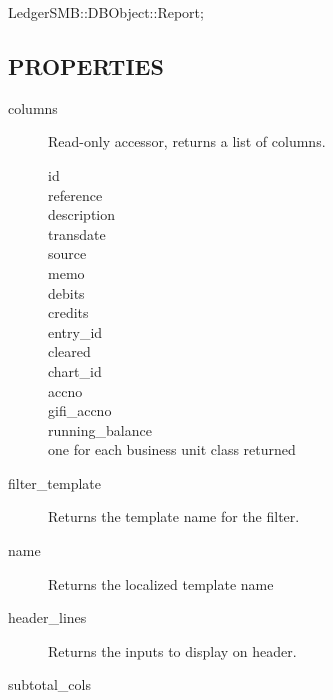 \begin{description}
\begin{description}
\begin{description}
\begin{description}
\begin{description}
\begin{description}
\begin{description}
\begin{description}
\begin{description}
\begin{description}
\begin{description}
\item[{LedgerSMB::DBObject::Report;}] \mbox{}\end{description}
\subsection*{PROPERTIES\label{LedgerSMB::DBObject::Report::GL_PROPERTIES}}
\begin{description}

\item[{columns}] \mbox{}

Read-only accessor, returns a list of columns.

\begin{description}

\item[{id}] \mbox{}
\item[{reference}] \mbox{}
\item[{description}] \mbox{}
\item[{transdate}] \mbox{}
\item[{source}] \mbox{}
\item[{memo}] \mbox{}
\item[{debits}] \mbox{}
\item[{credits}] \mbox{}
\item[{entry\_id}] \mbox{}
\item[{cleared}] \mbox{}
\item[{chart\_id}] \mbox{}
\item[{accno}] \mbox{}
\item[{gifi\_accno}] \mbox{}
\item[{running\_balance}] \mbox{}
\item[{one for each business unit class returned}] \mbox{}\end{description}

\item[{filter\_template}] \mbox{}

Returns the template name for the filter.


\item[{name}] \mbox{}

Returns the localized template name


\item[{header\_lines}] \mbox{}

Returns the inputs to display on header.


\item[{subtotal\_cols}] \mbox{}


\end{description}
\end{description}
\end{description}
\end{description}
\end{description}
\end{description}
\end{description}
\end{description}
\end{description}
\end{description}
\end{description}
